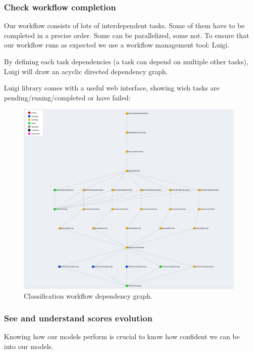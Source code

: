 \subsubsection{Check workflow completion}
Our workflow consists of lots of interdependent tasks. Some of them have to be completed in a precise order. Some can be parallelized, some not. To ensure that our workflow runs as expected we use a workflow management tool: Luigi.

By defining each task dependencies (a task can depend on multiple other tasks), Luigi will draw an acyclic directed dependency graph.

Luigi library comes with a useful web interface, showing wich tasks are pending/runing/completed or have failed:
\begin{figure}[H]
\centering
\includegraphics[scale=0.50]{./images/monitoring/luigi-graph-3.png}
\caption{Classification workflow dependency graph.}
\end{figure}

\subsubsection{See and understand scores evolution}
Knowing how our models perform is crucial to know how confident we can be into our models.

